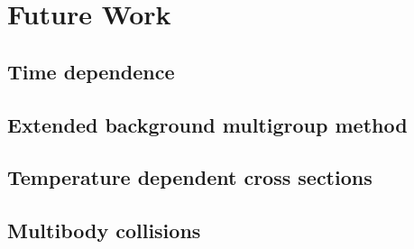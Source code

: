 \section{Future Work}

\subsection{Time dependence}

\subsection{Extended background multigroup method}

\subsection{Temperature dependent cross sections}

\subsection{Multibody collisions}